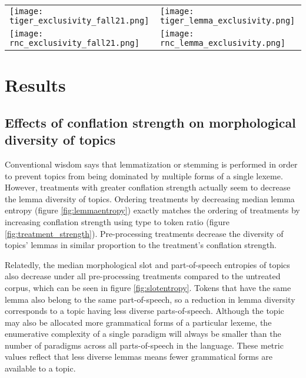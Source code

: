 \documentclass[11pt,a4paper]{article}
\begin{document}
\begin{figure*}[t]
    \label{fig:exclusivity}
    \begin{tabular}{ll}
        \texttt{[image: tiger\_exclusivity\_fall21.png]} & \texttt{[image: tiger\_lemma\_exclusivity.png]} \\
        \texttt{[image: rnc\_exclusivity\_fall21.png]} &
        \texttt{[image: rnc\_lemma\_exclusivity.png]}
    \end{tabular}
\end{figure*}


\section{Results}
\subsection{Effects of conflation strength on morphological diversity of topics}
Conventional wisdom says that lemmatization or stemming is performed in order to prevent topics from being dominated by multiple forms of a single lexeme. However, treatments with greater conflation strength actually seem to decrease the lemma diversity of topics. Ordering treatments by decreasing median lemma entropy (figure \ref{fig:lemmaentropy}) exactly matches the ordering of treatments by increasing conflation strength using type to token ratio (figure \ref{fig:treatment_strength}). Pre-processing treatments decrease the diversity of topics' lemmas in similar proportion to the treatment's conflation strength.

Relatedly, the median morphological slot and part-of-speech entropies of topics also decrease under all pre-processing treatments compared to the untreated corpus, which can be seen in figure \ref{fig:slotentropy}. Tokens that have the same lemma also belong to the same part-of-speech, so a reduction in lemma diversity corresponds to a topic having less diverse parts-of-speech. Although the topic may also be allocated more grammatical forms of a particular lexeme, the enumerative complexity of a single paradigm will always be smaller than the number of paradigms across all parts-of-speech in the language. These metric values reflect that less diverse lemmas means fewer grammatical forms are available to a topic.
\end{document}

